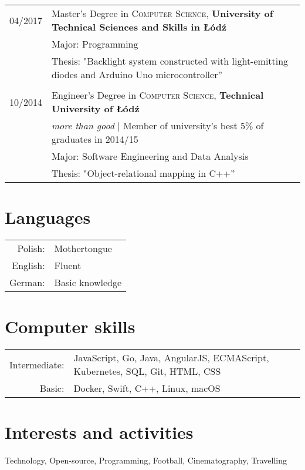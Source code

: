 \documentclass[a4paper,10pt]{article}
\begin{document}
\begin{tabular}{rl}	
04/2017 & Master's Degree in \textsc{Computer Science}, \textbf{University of Technical Sciences and Skills in Łódź} \\
& \small  Major: Programming\\
& \small Thesis: "Backlight system constructed with light-emitting diodes and Arduino Uno microcontroller'' \\&\\

10/2014 & Engineer's Degree in \textsc{Computer Science}, \textbf{Technical University of Łódź} \\
& \small\emph{more than good} | Member of university’s best 5\% of graduates in 2014/15\\
& \small  Major: Software Engineering and Data Analysis \\
& \small Thesis: "Object-relational mapping in C++'' \\
\end{tabular}

\section{Languages}

\begin{tabular}{rl}
	Polish: & Mothertongue\\
	English: & Fluent\\
	German: & Basic knowledge\\
\end{tabular}

\section{Computer skills}
\begin{tabular}{rl}
	Intermediate: & JavaScript, Go, Java, AngularJS, ECMAScript, Kubernetes, SQL, Git, HTML, CSS \\
	Basic: & Docker, Swift, C++, Linux, macOS \\
\end{tabular}

\section{Interests and activities}
Technology, Open-source, Programming, Football, Cinematography, Travelling
\end{document}

